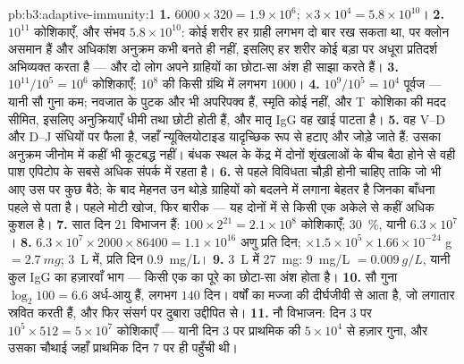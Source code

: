 \begin{solution}{pb:b3:adaptive-immunity:1}
\textbf{1.} $6000\times 320 = 1.9\times 10^{6}$; $\times 3\times 10^{4}
= 5.8\times 10^{10}$।
\textbf{2.} $10^{11}$ कोशिकाएँ, और संभव $5.8\times 10^{10}$: कोई
शरीर हर ग्राही लगभग दो बार रख सकता था, पर क्लोन असमान हैं और अधिकांश
अनुक्रम कभी बनते ही नहीं, इसलिए हर शरीर कोई बड़ा पर अधूरा प्रतिदर्श
अभिव्यक्त करता है --- और दो लोग अपने ग्राहियों का छोटा-सा अंश ही साझा
करते हैं।
\textbf{3.} $10^{11}/10^{5} = 10^{6}$ कोशिकाएँ; $10^{8}$ की किसी
ग्रंथि में लगभग $1000$।
\textbf{4.} $10^{9}/10^{5} = 10^{4}$ पूर्वज --- यानी सौ गुना कम;
नवजात के पुटक और  भी अपरिपक्व हैं, स्मृति कोई नहीं, और
T~कोशिका की मदद सीमित, इसलिए अनुक्रियाएँ धीमी तथा छोटी होती हैं, और
मातृ IgG वह खाई पाटता है।
\textbf{5.} वह V--D और D--J संधियों पर फैला है, जहाँ न्यूक्लियोटाइड
यादृच्छिक रूप से हटाए और जोड़े जाते हैं: उसका अनुक्रम जीनोम में कहीं
भी कूटबद्ध नहीं। बंधक स्थल के केंद्र में दोनों शृंखलाओं के बीच बैठा
होने से वही पाश एपिटोप के सबसे अधिक संपर्क में रहता है।
\textbf{6.}  से पहले विविधता चौड़ी होनी चाहिए ताकि जो भी आए उस
पर कुछ बैठे;  के बाद मेहनत उन थोड़े ग्राहियों को बदलने में
लगाना बेहतर है जिनका बाँधना पहले से पता है। पहले मोटी खोज, फिर बारीक
--- यह दोनों में से किसी एक अकेले से कहीं अधिक कुशल है।
\textbf{7.} सात दिन $21$ विभाजन हैं: $100\times 2^{21} = 2.1\times
10^{8}$ कोशिकाएँ; \qty{30}{\%}, यानी $6.3\times 10^{7}$ ।
\textbf{8.} $6.3\times 10^{7}\times 2000\times \num{86400} = 1.1\times
10^{16}$ अणु प्रति दिन; $\times 1.5\times 10^{5}\times 1.66\times
10^{-24}$ g $= \qty{2.7}{mg}$; \qty{3}{L} में, प्रति दिन \qty{0.9}{mg/L}।
\textbf{9.} \qty{3}{L} में \qty{27}{mg}: \qty{9}{mg/L} $= \qty{0.009}{g/L}$,
यानी कुल IgG का हज़ारवाँ भाग --- किसी एक  का  पूरे का
छोटा-सा अंश होता है।
\textbf{10.} सौ गुना $\log_{2}100 = 6.6$ अर्ध-आयु हैं, लगभग
$140$ दिन। वर्षों का  मज्जा की दीर्घजीवी 
से आता है, जो लगातार स्रवित करती हैं, और फिर संसर्ग पर दुबारा उद्दीपित
 से।
\textbf{11.} नौ विभाजन: दिन 3 पर $10^{5}\times 512 = 5\times 10^{7}$
कोशिकाएँ --- यानी दिन 3 पर प्राथमिक की $5\times 10^{4}$ से हज़ार गुना,
और उसका चौथाई जहाँ प्राथमिक दिन 7 पर ही पहुँची थी।

\end{solution}
